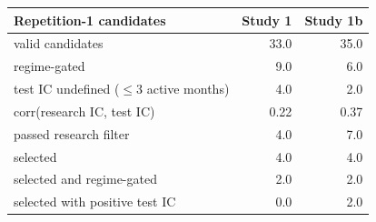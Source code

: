 \begin{tabular}{lrr}
\toprule
Repetition-1 candidates & Study 1 & Study 1b \\
\midrule
valid candidates & 33.0 & 35.0 \\
regime-gated & 9.0 & 6.0 \\
test IC undefined ($\leq$3 active months) & 4.0 & 2.0 \\
corr(research IC, test IC) & 0.22 & 0.37 \\
passed research filter & 4.0 & 7.0 \\
selected & 4.0 & 4.0 \\
selected and regime-gated & 2.0 & 2.0 \\
selected with positive test IC & 0.0 & 2.0 \\
\bottomrule
\end{tabular}
